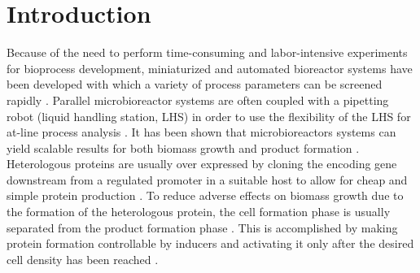 \documentclass[sn-standardnature]{sn-jnl}%
\theoremstyle{thmstyleone}%
\theoremstyle{thmstyletwo}%
\theoremstyle{thmstylethree}%
\begin{document}
\section{Introduction}
\label{sec_intro}

Because of the need to perform time-consuming and labor-intensive experiments for bioprocess development, miniaturized and automated bioreactor systems have been developed with which a variety of process parameters can be screened rapidly \cite{weuster2005parallel,hemmerich2018microbioreactor}.
Parallel microbioreactor systems are often coupled with a pipetting robot (liquid handling station, LHS) in order to use the flexibility of the LHS for at-line process analysis \cite{haby2019integrated,puskeiler2005development,rohe2012automated}. It has been shown that microbioreactors systems can yield scalable results for both biomass growth and product formation \cite{puskeiler2005development,schmideder2016high,kensy2009scale}.
Heterologous proteins are usually over expressed by cloning the encoding gene downstream from a regulated promoter in a suitable host to allow for cheap and simple protein production \cite{terpe2006overview}.
To reduce adverse effects on biomass growth due to the formation of the heterologous protein, the cell formation phase is usually separated from the product formation phase \cite{choi2000efficient,schmideder2016high,jahic2006process,neubauer2001expression}.
This is accomplished by making protein formation controllable by inducers and activating it only after the desired cell density has been reached \cite{neubauer2001expression}.
\end{document}
